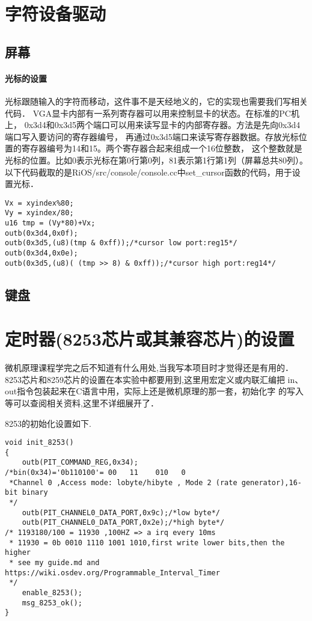 \section{字符设备驱动}
\subsection{屏幕}
\paragraph{光标的设置} 光标跟随输入的字符而移动，这件事不是天经地义的，它的实现也需要我们写相关代码．
VGA显卡内部有一系列寄存器可以用来控制显卡的状态。在标准的PC机上，
0x3d4和0x3d5两个端口可以用来读写显卡的内部寄存器。方法是先向0x3d4端口写入要访问的寄存器编号，
再通过0x3d5端口来读写寄存器数据。存放光标位置的寄存器编号为14和15。两个寄存器合起来组成一个16位整数，
这个整数就是光标的位置。比如0表示光标在第0行第0列，81表示第1行第1列（屏幕总共80列）。 
以下代码截取的是RiOS/src/console/console.cc中set\_cursor函数的代码，用于设置光标．

\begin{verbatim}
Vx = xyindex%80;
Vy = xyindex/80;
u16 tmp = (Vy*80)+Vx;
outb(0x3d4,0x0f);
outb(0x3d5,(u8)(tmp & 0xff));/*cursor low port:reg15*/
outb(0x3d4,0x0e);
outb(0x3d5,(u8)( (tmp >> 8) & 0xff));/*cursor high port:reg14*/
\end{verbatim}    
\subsection{键盘}
\section{定时器(8253芯片或其兼容芯片)的设置}

微机原理课程学完之后不知道有什么用处,当我写本项目时才觉得还是有用的．
8253芯片和8259芯片的设置在本实验中都要用到,这里用宏定义或内联汇编把
in、out指令包装起来在C语言中用，实际上还是微机原理的那一套，初始化字
的写入等可以查阅相关资料,这里不详细展开了．

8253的初始化设置如下.
\begin{verbatim}
void init_8253()
{
	outb(PIT_COMMAND_REG,0x34);
/*bin(0x34)='0b110100'= 00   11    010   0
 *Channel 0 ,Access mode: lobyte/hibyte , Mode 2 (rate generator),16-bit binary 
 */	
	outb(PIT_CHANNEL0_DATA_PORT,0x9c);/*low byte*/
	outb(PIT_CHANNEL0_DATA_PORT,0x2e);/*high byte*/
/* 1193180/100 = 11930 ,100HZ => a irq every 10ms
 * 11930 = 0b 0010 1110 1001 1010,first write lower bits,then the higher
 * see my guide.md and https://wiki.osdev.org/Programmable_Interval_Timer
 */	
	enable_8253();
	msg_8253_ok();
}
\end{verbatim}    
